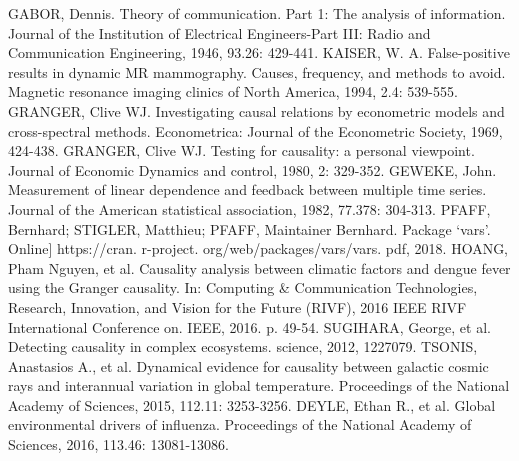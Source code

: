 \documentclass[a4paper,11pt,oneside]{book}
\begin{document}
\begin{thebibliography}{00}
GABOR, Dennis. Theory of communication. Part 1: The analysis of information. Journal of the Institution of Electrical Engineers-Part III: Radio and Communication Engineering, 1946, 93.26: 429-441.
KAISER, W. A. False-positive results in dynamic MR mammography. Causes, frequency, and methods to avoid. Magnetic resonance imaging clinics of North America, 1994, 2.4: 539-555.
GRANGER, Clive WJ. Investigating causal relations by econometric models and cross-spectral methods. Econometrica: Journal of the Econometric Society, 1969, 424-438.
GRANGER, Clive WJ. Testing for causality: a personal viewpoint. Journal of Economic Dynamics and control, 1980, 2: 329-352.
GEWEKE, John. Measurement of linear dependence and feedback between multiple time series. Journal of the American statistical association, 1982, 77.378: 304-313.
PFAFF, Bernhard; STIGLER, Matthieu; PFAFF, Maintainer Bernhard. Package ‘vars’. Online] https://cran. r-project. org/web/packages/vars/vars. pdf, 2018.
HOANG, Pham Nguyen, et al. Causality analysis between climatic factors and dengue fever using the Granger causality. In: Computing \& Communication Technologies, Research, Innovation, and Vision for the Future (RIVF), 2016 IEEE RIVF International Conference on. IEEE, 2016. p. 49-54.
SUGIHARA, George, et al. Detecting causality in complex ecosystems. science, 2012, 1227079.
TSONIS, Anastasios A., et al. Dynamical evidence for causality between galactic cosmic rays and interannual variation in global temperature. Proceedings of the National Academy of Sciences, 2015, 112.11: 3253-3256.
DEYLE, Ethan R., et al. Global environmental drivers of influenza. Proceedings of the National Academy of Sciences, 2016, 113.46: 13081-13086.
\end{thebibliography}






\appendix




%


\end{document}
